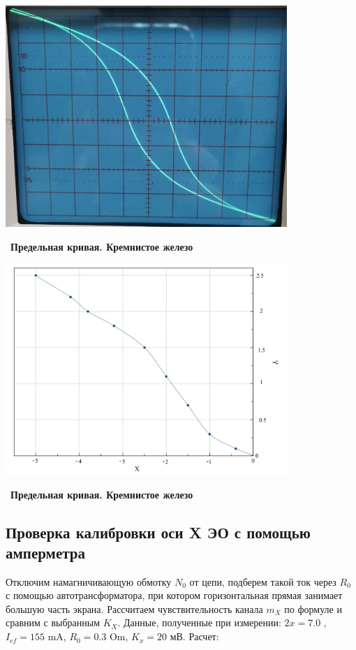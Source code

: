 \newpage

\begin{center}
	\includegraphics[width = 0.8\textwidth]{pics/3.jpg}
\end{center}\
\textbf{Предельная кривая. Кремнистое железо}

\begin{center}
	\includegraphics[width = 0.8\textwidth]{pics/2_rev.jpg}
\end{center}\
\textbf{Предельная кривая. Кремнистое железо}

\subsection {Проверка калибровки оси X ЭО с помощью амперметра}


Отключим намагничивающую обмотку $N_0$ от цепи,  подберем такой ток через $R_0$ с помощью автотрансформатора, при котором горизонтальная прямая занимает большую часть экрана. Рассчитаем чувствительность канала $m_X$ по формуле и сравним с выбранным $K_X$.
\newline
Данные, полученные при измерении: $2x=7.0 $ , $I_{ef} = 155$ mA, $R_0 = 0.3$ Om, $K_x = 20 $ мВ.
\newline
Расчет:


